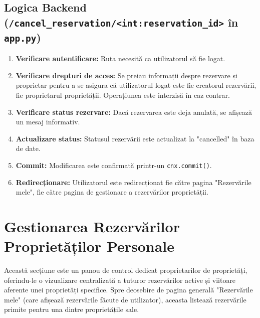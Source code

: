 \documentclass[12pt, a4paper, oneside, romanian]{teza-upb}
\begin{document}
\subsection{Logica Backend (\texttt{/cancel\_reservation/<int:reservation\_id>} în \texttt{app.py})}
\begin{enumerate}
	\item \textbf{Verificare autentificare:} Ruta necesită ca utilizatorul să fie logat.
	\item \textbf{Verificare drepturi de acces:} Se preiau informații despre rezervare și proprietar pentru a se asigura că utilizatorul logat este fie creatorul rezervării, fie proprietarul proprietății. Operațiunea este interzisă în caz contrar.
	\item \textbf{Verificare status rezervare:} Dacă rezervarea este deja anulată, se afișează un mesaj informativ.
	\item \textbf{Actualizare status:} Statusul rezervării este actualizat la "cancelled" în baza de date.
	\item \textbf{Commit:} Modificarea este confirmată printr-un \texttt{cnx.commit()}.
	\item \textbf{Redirecționare:} Utilizatorul este redirecționat fie către pagina "Rezervările mele", fie către pagina de gestionare a rezervărilor proprietății.
\end{enumerate}







\section{Gestionarea Rezervărilor Proprietăților Personale}


Această secțiune este un panou de control dedicat proprietarilor de proprietăți, oferindu-le o vizualizare centralizată a tuturor rezervărilor active și viitoare aferente unei proprietăți specifice. Spre deosebire de pagina generală "Rezervările mele" (care afișează rezervările făcute de utilizator), aceasta listează rezervările primite pentru una dintre proprietățile sale.
\end{document}
